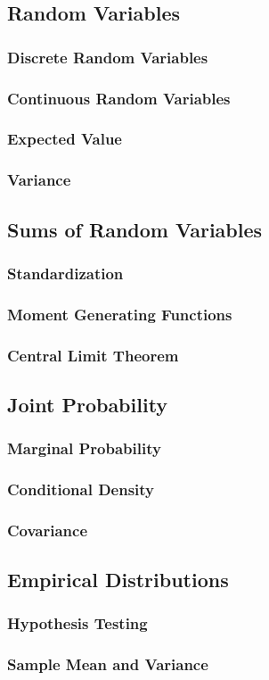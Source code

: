 \subsection{Random Variables}
\subsubsection{Discrete Random Variables}
\subsubsection{Continuous Random Variables}
\subsubsection{Expected Value}
\subsubsection{Variance}
\subsection{Sums of Random Variables}
\subsubsection{Standardization}
\subsubsection{Moment Generating Functions}
\subsubsection{Central Limit Theorem}
\subsection{Joint Probability}
\subsubsection{Marginal Probability}
\subsubsection{Conditional Density}
\subsubsection{Covariance}
\subsection{Empirical Distributions}
\subsubsection{Hypothesis Testing}
\subsubsection{Sample Mean and Variance}